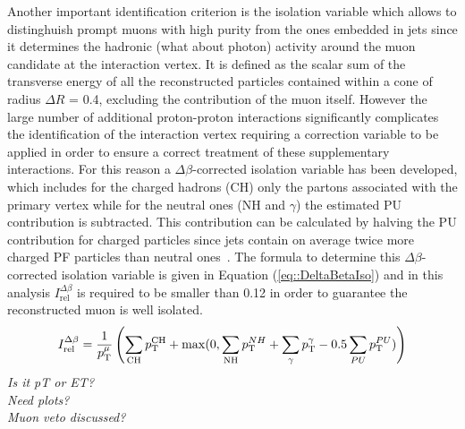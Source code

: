 Another important identification criterion is the isolation variable which allows to distinghuish prompt muons with high purity from the ones embedded in jets since it determines the hadronic (what about photon) activity around the muon candidate at the interaction vertex. %
It is defined as the scalar sum of the transverse energy of all the reconstructed particles contained within a cone of radius $\Delta R$ = 0.4, excluding the contribution of the muon itself.
However the large number of additional proton-proton interactions significantly complicates the identification of the interaction vertex requiring a correction variable to be applied in order to ensure a correct treatment of these supplementary interactions. 
For this reason a $\Delta \beta$-corrected isolation variable has been developed, which includes for the charged hadrons (CH) only the partons associated with the primary vertex while for the neutral ones (NH and $\gamma$) the estimated PU contribution is subtracted. This contribution can be calculated by halving the PU contribution for charged particles since jets contain on average twice more charged PF particles than neutral ones~\cite{CHContrVsN}. The formula to determine this $\Delta \beta$-corrected isolation variable is given in Equation (\ref{eq::DeltaBetaIso}) and in this analysis $I_{\textrm{rel}}^{\Delta \beta}$ is required to be smaller than 0.12 in order to guarantee the reconstructed muon is well isolated.
\begin{equation}\label{eq::DeltaBetaIso}
 I_{\textrm{rel}}^{\Delta \beta} = \frac{1}{p_{\rm T}^{\mu}} \left( \sum_{\textrm{CH}} p_{\rm T}^{\textrm{CH}} + \max(0, \sum_{\textrm{NH}} p_{\rm T}^{NH} + \sum_{\gamma} p_{\rm T}^{\gamma} - 0.5 \sum_{PU} p_{\rm T}^{PU}) \right)
\end{equation}
\textit{Is it pT or ET?}\\
\textit{Need plots?}\\
\textit{Muon veto discussed?}

